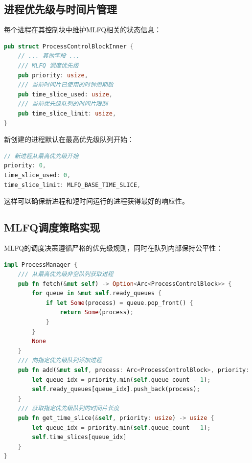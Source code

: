 \subsection{进程优先级与时间片管理}

每个进程在其控制块中维护MLFQ相关的状态信息：

\begin{lstlisting}[language=Rust,caption={进程MLFQ状态}, label={lst:process-mlfq-state}]
pub struct ProcessControlBlockInner {
    // ... 其他字段 ...
    /// MLFQ 调度优先级
    pub priority: usize,
    /// 当前时间片已使用的时钟周期数
    pub time_slice_used: usize,
    /// 当前优先级队列的时间片限制
    pub time_slice_limit: usize,
}
\end{lstlisting}

新创建的进程默认在最高优先级队列开始：

\begin{lstlisting}[language=Rust,caption={新进程优先级初始化}, label={lst:new-process-priority}]
// 新进程从最高优先级开始
priority: 0,
time_slice_used: 0,
time_slice_limit: MLFQ_BASE_TIME_SLICE,
\end{lstlisting}

这样可以确保新进程和短时间运行的进程获得最好的响应性。

\subsection{MLFQ调度策略实现}

MLFQ的调度决策遵循严格的优先级规则，同时在队列内部保持公平性：

\begin{lstlisting}[language=Rust,caption={MLFQ调度算法}, label={lst:mlfq-fetch}]
impl ProcessManager {
    /// 从最高优先级非空队列获取进程
    pub fn fetch(&mut self) -> Option<Arc<ProcessControlBlock>> {
        for queue in &mut self.ready_queues {
            if let Some(process) = queue.pop_front() {
                return Some(process);
            }
        }
        None
    }
    /// 向指定优先级队列添加进程
    pub fn add(&mut self, process: Arc<ProcessControlBlock>, priority: usize) {
        let queue_idx = priority.min(self.queue_count - 1);
        self.ready_queues[queue_idx].push_back(process);
    }
    /// 获取指定优先级队列的时间片长度
    pub fn get_time_slice(&self, priority: usize) -> usize {
        let queue_idx = priority.min(self.queue_count - 1);
        self.time_slices[queue_idx]
    }
}
\end{lstlisting}


